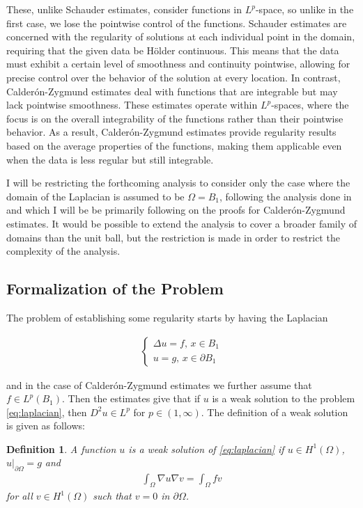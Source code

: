 \documentclass[12pt]{artikel1}
\newtheorem{definition}{Definition}[section]
\begin{document}
These, unlike Schauder estimates, consider functions in $L^p$-space, so unlike in the first case, we lose the pointwise control of the functions.  Schauder estimates are concerned with the regularity of solutions at each individual point in the domain, requiring that the given data be Hölder continuous. This means that the data must exhibit a certain level of smoothness and continuity pointwise, allowing for precise control over the behavior of the solution at every location. In contrast, Calderón-Zygmund estimates deal with functions that are integrable but may lack pointwise smoothness. These estimates operate within $L^p$-spaces, where the focus is on the overall integrability of the functions rather than their pointwise behavior. As a result, Calderón-Zygmund estimates provide regularity results based on the average properties of the functions, making them applicable even when the data is less regular but still integrable.

I will be restricting the forthcoming analysis to consider only the case where the domain of the Laplacian is assumed to be $\Omega=B_1$, following the analysis done in \cite{covi,Fern_ndez_Real_2022} and \cite{sanpera} which I will be be primarily following on the proofs for Calder\'{o}n-Zygmund estimates. It would be possible to extend the analysis to cover a broader family of domains than the unit ball, but the restriction is made in order to restrict the complexity of the analysis.

\subsection*{Formalization of the Problem}

The problem of establishing some regularity starts by having the Laplacian

\begin{gather}\label{eq:laplacian}
    \begin{cases}
        \Delta u=f,\,x\in B_1 \\
        u=g,\,x\in\partial B_1
    \end{cases}
\end{gather}

\noindent and in the case of Calder\'{o}n-Zygmund estimates we further assume that $f\in L^{p}(B_1)$. Then the estimates give that if $u$ is a weak solution to the problem \ref{eq:laplacian}, then $D^2u\in L^p$ for $p\in (1,\infty)$. The definition of a weak solution is given as follows:

\begin{definition}\label{def:weak}
    A function $u$ is a weak solution of \ref{eq:laplacian} if $u\in H^1(\Omega)$, $u|_{\partial\Omega}=g$ and 
    \begin{gather*}
        \int_\Omega\nabla u\nabla v=\int_\Omega fv
    \end{gather*}
    for all $v\in H^1(\Omega)$ such that $v=0$ in $\partial\Omega$.
\end{definition}
\end{document}
